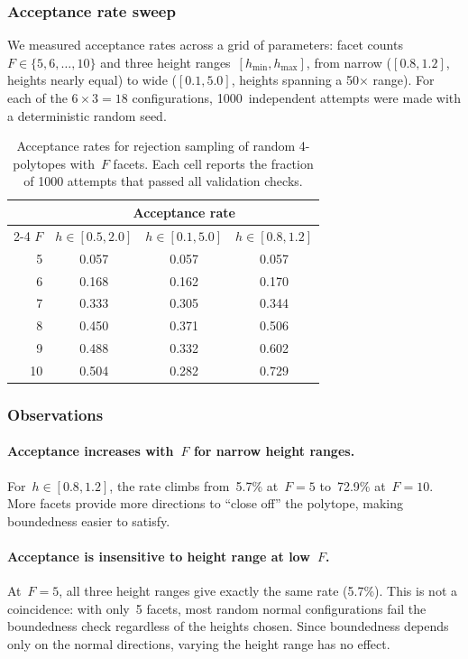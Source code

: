 \subsubsection*{Acceptance rate sweep}

We measured acceptance rates across a grid of parameters: facet
counts~$F \in \{5, 6, \ldots, 10\}$ and three height
ranges~$[h_{\min}, h_{\max}]$, from narrow ($[0.8, 1.2]$, heights nearly
equal) to wide ($[0.1, 5.0]$, heights spanning a 50$\times$ range). For each
of the $6 \times 3 = 18$ configurations, 1000~independent attempts were made
with a deterministic random seed.

\begin{table}[ht]
\centering
\begin{tabular}{r ccc}
\toprule
& \multicolumn{3}{c}{Acceptance rate} \\
\cmidrule(lr){2-4}
$F$ & $h \in [0.5, 2.0]$ & $h \in [0.1, 5.0]$ & $h \in [0.8, 1.2]$ \\
\midrule
 5 & 0.057 & 0.057 & 0.057 \\
 6 & 0.168 & 0.162 & 0.170 \\
 7 & 0.333 & 0.305 & 0.344 \\
 8 & 0.450 & 0.371 & 0.506 \\
 9 & 0.488 & 0.332 & 0.602 \\
10 & 0.504 & 0.282 & 0.729 \\
\bottomrule
\end{tabular}
\caption{Acceptance rates for rejection sampling of random 4-polytopes
  with~$F$ facets. Each cell reports the fraction of 1000 attempts that passed
  all validation checks.}
\label{tab:acceptance-rates}
\end{table}

\subsubsection*{Observations}

\paragraph{Acceptance increases with~$F$ for narrow height ranges.}
For~$h \in [0.8, 1.2]$, the rate climbs from~5.7\% at~$F = 5$ to~72.9\%
at~$F = 10$. More facets provide more directions to ``close off'' the
polytope, making boundedness easier to satisfy.

\paragraph{Acceptance is insensitive to height range at low~$F$.}
At~$F = 5$, all three height ranges give exactly the same rate (5.7\%).
This is not a coincidence: with only~5 facets, most random normal
configurations fail the boundedness check regardless of the heights chosen.
Since boundedness depends only on the normal directions, varying the height
range has no effect.

